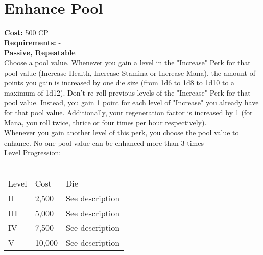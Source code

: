 \section{Enhance Pool}\label{sec:enhancepool}
\textbf{Cost:} 500 CP\\
\textbf{Requirements:} -\\
\textbf{Passive, Repeatable}\\
Choose a pool value. Whenever you gain a level in the "Increase" Perk for that pool value (Increase Health, Increase Stamina or Increase Mana), the amount of points you gain is increased by one die size (from 1d6 to 1d8 to 1d10 to a maximum of 1d12). Don't re-roll previous levels of the "Increase" Perk for that pool value. Instead, you gain 1 point for each level of "Increase" you already have for that pool value. Additionally, your regeneration factor is increased by 1 (for Mana, you roll twice, thrice or four times per hour respectively).\\
Whenever you gain another level of this perk, you choose the pool value to enhance. No one pool value can be enhanced more than 3 times
\\
Level Progression:\\
\\
\begin{tabular}{l | l | p{12cm} }
    Level & Cost & Die\\
    II & 2,500 & See description \\
    III & 5,000 & See description \\
    IV & 7,500 & See description\\
    V & 10,000 & See description\\
\end{tabular}